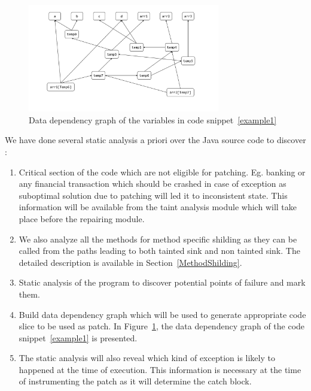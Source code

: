 \begin{figure}[!htb]
\centering
\includegraphics[width=3.3in]{images/depG.pdf}
\caption{Data dependency graph of the variables in code snippet~\ref{example1}}
\label{fig:datadep}
\end{figure}

We have done several  static analysis a priori  over the Java source code to
discover :
\begin{enumerate}
  
  \item Critical section of the code which are not eligible for patching. Eg.
  banking or any financial transaction which should be crashed in case of
  exception as suboptimal solution due to patching will led it to inconsistent
  state. This information will be available from the taint analysis module which
  will take place before the repairing module.
  
  \item We also analyze all the methods for method specific shilding as they can
  be called from the paths leading to both tainted sink and non tainted sink.
  The detailed description is available in Section~\ref{MethodShilding}.
  
  \item Static analysis of the program to discover potential points of failure and
  mark them.
  
  \item Build data dependency graph which will be used to generate appropriate
  code slice to be used as patch.
  In Figure~\ref{fig:datadep}, the data dependency graph of the
  code snippet~\ref{example1} is presented.
  
  \item The static analysis will also reveal which kind of exception is likely to
  happened at the time of execution.
  This information is necessary at the time of instrumenting the patch as it will
  determine the catch block.
  
\end{enumerate}

